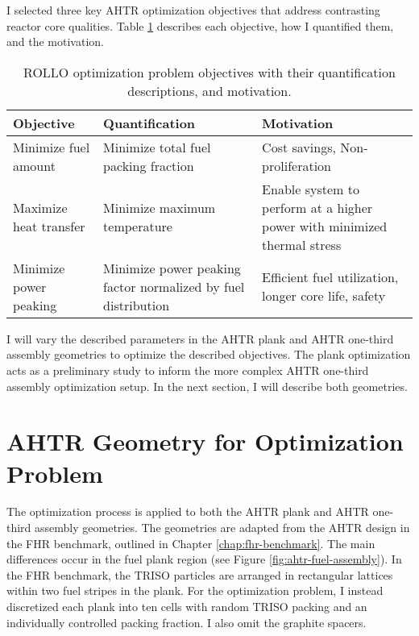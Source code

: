 I selected three key \gls{AHTR} optimization objectives that address contrasting reactor 
core qualities. 
Table \ref{tab:objectives} describes each objective, how I quantified them, and the motivation.
\begin{table}[]
    \centering
    \onehalfspacing
    \caption{\acrfull{ROLLO} optimization problem objectives with their quantification 
    descriptions, and motivation.}
	\label{tab:objectives}
    \footnotesize
    \begin{tabular}{p{4cm}p{5cm}p{5cm}}
    \hline 
    \textbf{Objective}& \textbf{Quantification}& \textbf{Motivation} \\
    \hline
    Minimize fuel amount & Minimize total fuel packing fraction & Cost savings, Non-proliferation \\ 
    \hline
    Maximize heat transfer & Minimize maximum temperature & Enable system to perform at a higher power with minimized thermal stress \\
    \hline
    Minimize power peaking & Minimize power peaking factor normalized by fuel distribution & Efficient fuel utilization, longer core life, safety\\
    \hline
    \end{tabular}
\end{table}
I will vary the described parameters in the \gls{AHTR} plank and \gls{AHTR} one-third assembly 
geometries to optimize the described objectives. 
The plank optimization acts as a preliminary study to inform the more complex \gls{AHTR} one-third
assembly optimization setup. 
In the next section, I will describe both geometries. 

\section{AHTR Geometry for Optimization Problem}
The optimization process is applied to both the \gls{AHTR} plank and \gls{AHTR} one-third
assembly geometries.
The geometries are adapted from the \gls{AHTR} design in the \gls{FHR} benchmark,
outlined in Chapter \ref{chap:fhr-benchmark}.
The main differences occur in the fuel plank region (see Figure \ref{fig:ahtr-fuel-assembly}). 
In the \gls{FHR} benchmark, the TRISO particles are arranged in rectangular lattices within
two fuel stripes in the plank. 
For the optimization problem, I instead discretized each plank into ten cells with random 
TRISO packing and an individually controlled packing fraction. 
I also omit the graphite spacers. 

